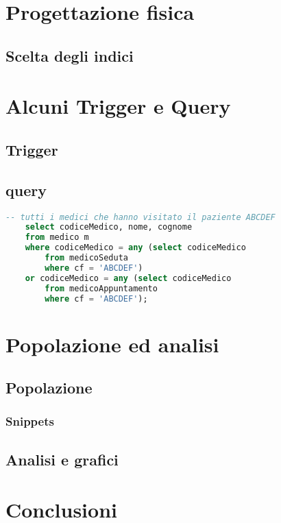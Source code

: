\documentclass[11pt]{article}
\begin{document}
\section{Progettazione fisica}
\subsection{Scelta degli indici}


\section{Alcuni Trigger e Query}
\subsection{Trigger}
\subsection{query}
\begin{lstlisting}[language=SQL]
    -- tutti i medici che hanno visitato il paziente ABCDEF
    select codiceMedico, nome, cognome
    from medico m
    where codiceMedico = any (select codiceMedico
        from medicoSeduta
        where cf = 'ABCDEF')
    or codiceMedico = any (select codiceMedico
        from medicoAppuntamento
        where cf = 'ABCDEF');
\end{lstlisting}


\section{Popolazione ed analisi}
\subsection{Popolazione}
\subsubsection{Snippets}

\subsection{Analisi e grafici}


\section{Conclusioni}
\end{document}
